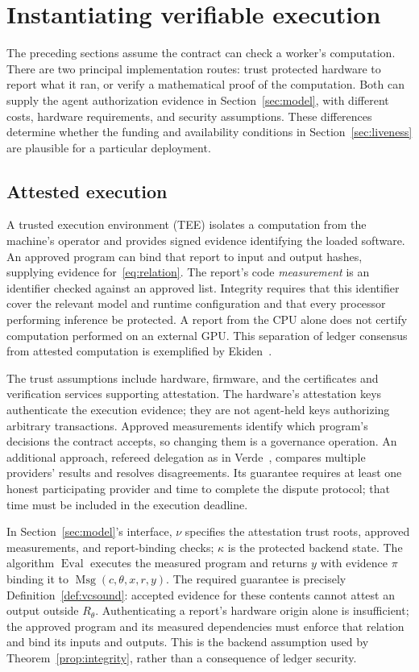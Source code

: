 \documentclass[10pt,letterpaper]{article}
\newcommand{\Msg}{\operatorname{Msg}}
\begin{document}
\section{Instantiating verifiable execution}
\label{sec:backends}
The preceding sections assume the contract can check a worker's computation. There are two principal implementation routes: trust protected hardware to report what it ran, or verify a mathematical proof of the computation. Both can supply the agent authorization evidence in Section~\ref{sec:model}, with different costs, hardware requirements, and security assumptions. These differences determine whether the funding and availability conditions in Section~\ref{sec:liveness} are plausible for a particular deployment.

\subsection{Attested execution}
A trusted execution environment (TEE) isolates a computation from the machine's operator and provides signed evidence identifying the loaded software. An approved program can bind that report to input and output hashes, supplying evidence for~\eqref{eq:relation}. The report's code \emph{measurement} is an identifier checked against an approved list. Integrity requires that this identifier cover the relevant model and runtime configuration and that every processor performing inference be protected. A report from the CPU alone does not certify computation performed on an external GPU. This separation of ledger consensus from attested computation is exemplified by Ekiden~\citep{ekiden2019}.

The trust assumptions include hardware, firmware, and the certificates and verification services supporting attestation. The hardware's attestation keys authenticate the execution evidence; they are not agent-held keys authorizing arbitrary transactions. Approved measurements identify which program's decisions the contract accepts, so changing them is a governance operation. An additional approach, refereed delegation as in Verde~\citep{verde2025}, compares multiple providers' results and resolves disagreements. Its guarantee requires at least one honest participating provider and time to complete the dispute protocol; that time must be included in the execution deadline.

In Section~\ref{sec:model}'s interface, $\nu$ specifies the attestation trust roots, approved measurements, and report-binding checks; $\kappa$ is the protected backend state. The algorithm $\operatorname{Eval}$ executes the measured program and returns $y$ with evidence $\pi$ binding it to $\Msg(c,\theta,x,r,y)$. The required guarantee is precisely Definition~\ref{def:vcsound}: accepted evidence for these contents cannot attest an output outside $R_\theta$. Authenticating a report's hardware origin alone is insufficient; the approved program and its measured dependencies must enforce that relation and bind its inputs and outputs. This is the backend assumption used by Theorem~\ref{prop:integrity}, rather than a consequence of ledger security.
\end{document}
